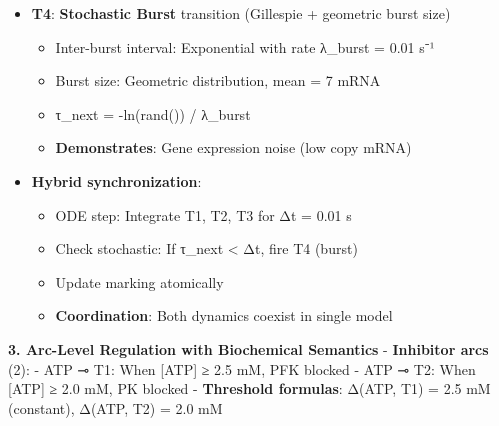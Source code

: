 \begin{itemize}
\tightlist
\item
  \textbf{T4}: \textbf{Stochastic Burst} transition (Gillespie +
  geometric burst size)

  \begin{itemize}
  \tightlist
  \item
    Inter-burst interval: Exponential with rate λ\_burst = 0.01 s⁻¹
  \item
    Burst size: Geometric distribution, mean = 7 mRNA
  \item
    τ\_next = -ln(rand()) / λ\_burst
  \item
    \textbf{Demonstrates}: Gene expression noise (low copy mRNA)
  \end{itemize}
\item
  \textbf{Hybrid synchronization}:

  \begin{itemize}
  \tightlist
  \item
    ODE step: Integrate T1, T2, T3 for Δt = 0.01 s
  \item
    Check stochastic: If τ\_next \textless{} Δt, fire T4 (burst)
  \item
    Update marking atomically
  \item
    \textbf{Coordination}: Both dynamics coexist in single model
  \end{itemize}
\end{itemize}

\textbf{3. Arc-Level Regulation with Biochemical Semantics} \checkmark -
\textbf{Inhibitor arcs} (2): - ATP ⊸ T1: When {[}ATP{]} ≥ 2.5 mM, PFK
blocked - ATP ⊸ T2: When {[}ATP{]} ≥ 2.0 mM, PK blocked -
\textbf{Threshold formulas}: Δ(ATP, T1) = 2.5 mM (constant), Δ(ATP, T2)
= 2.0 mM

